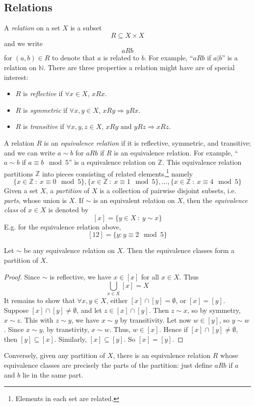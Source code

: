 \documentclass[10pt, a4paper, twoside]{report}
\begin{document}
\subsection{Relations}
A \emph{relation} on a set \(X\) is a subset 
\[R\subseteq X\times X\]
and we write 
\[aRb\]
for \((a,b)\in R\) to denote that \(a\) is related to \(b\). For example, ``\(aRb\) if \(a|b\)'' is a relation on \(\mathbb{N}\). There are three properties a relation might have are of special interest:
\begin{itemize}
    \item \(R\) is \emph{reflective} if \(\forall x\in X\), \(xRx\).
    \item \(R\) is \emph{symmetric} if \(\forall x,y\in X\), \(xRy\Rightarrow yRx\).
    \item \(R\) is \emph{transitive} if \(\forall x,y,z\in X\), \(xRy\text{  and  }yRz\Rightarrow xRz\).
\end{itemize}
A relation \(R\) is an \emph{equivalence relation} if it is reflective, symmetric, and transitive; and we can write \(a\sim b\) for \(aRb\) if \(R\) is an equivalence relation. For example, ``\(a\sim b\) if \(a\equiv b\mod 5\)'' is a equivalence relation on \(\mathbb{Z}\). This equivalence relation partitions \(\mathbb{Z}\) into pieces consisting of related elements,\footnote{Elements in each set are related.} namely
\[\{x\in\mathbb{Z}\::\:x\equiv 0\mod 5\},\{x\in\mathbb{Z}\::\:x\equiv 1\mod 5\},\ldots,\{x\in\mathbb{Z}\::\:x\equiv 4\mod 5\}\] 
Given a set \(X\), a \emph{partition} of \(X\) is a collection of pairwise disjoint subsets, i.e. \emph{parts}, whose union is \(X\). If \(\sim\) is an equivalent relation on \(X\), then the \emph{equivalence class} of \(x\in X\) is denoted by 
\[[x]=\{y\in X\::\:y\sim x\}\]
E.g. for the equivalence relation above,
\[[12]=\{y:y\equiv 2\mod 5\}\]
\begin{theorem}
    Let \(\sim\) be any equivalence relation on \(X\). Then the equivalence classes form a partition of \(X\).
\end{theorem}
\begin{proof}
    Since \(\sim\) is reflective, we have \(x\in[x]\) for all \(x\in X\). Thus 
    \[\bigcup_{x\in X}[x]=X\]
    It remains to show that \(\forall x,y\in X\), either \([x]\cap[y]=\emptyset\), or \([x]=[y]\). Suppose \([x]\cap[y]\neq\emptyset\), and let \(z\in[x]\cap[y]\). Then \(z\sim x\), so by symmetry, \(x\sim z\). This with \(z\sim y\), we have \(x\sim y\) by transitivity. Let now \(w\in[y]\), so \(y\sim w\). Since \(x\sim y\), by transtivity, \(x\sim w\). Thus, \(w\in [x]\). Hence if \([x]\cap[y]\neq\emptyset\), then \([y]\subseteq[x]\). Similarly, \([x]\subseteq[y]\). \newline So \([x]=[y]\).
\end{proof}
Conversely, given any partition of \(X\), there is an equivalence relation \(R\) whose equivalence classes are precisely the parts of the partition: just define \(aRb\) if \(a\) and \(b\) lie in the same part. 
\end{document}
